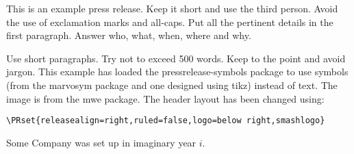 \documentclass[a4paper,11pt]{pressrelease}
\date{Some City, \today}
\begin{document}
\begin{pressrelease}

This is an example press release. Keep it short and use the third
person. Avoid the use of exclamation marks and all-caps. Put all the
pertinent details in the first paragraph. Answer who, what, when,
where and why.

Use short paragraphs. Try not to exceed 500 words. Keep to the point
and avoid jargon. This example has loaded the
\textsf{pressrelease-symbols} package to use symbols (from the
\textsf{marvosym} package and one designed using \textsf{tikz}) instead of text.
The image is from the \textsf{mwe} package. The header layout has
been changed using:
\begin{verbatim}
\PRset{releasealign=right,ruled=false,logo=below right,smashlogo}
\end{verbatim}

\begin{about}
Some Company was set up in imaginary year $i$.
\end{about}

\end{pressrelease}
\end{document}
